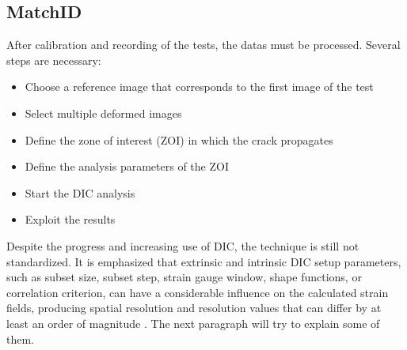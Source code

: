 \subsection{MatchID}

After calibration and recording of the tests, the datas must be processed. Several steps are necessary:

\begin{itemize}
	\item Choose a reference image that corresponds to the first image of the test 
	\item Select multiple deformed images
	\item Define the zone of interest (ZOI) in which the crack propagates
	\item Define the analysis parameters of the ZOI
	\item Start the DIC analysis
	\item Exploit the results
\end{itemize}

Despite the progress and increasing use of DIC, the technique is still not standardized. It is emphasized that extrinsic and intrinsic DIC setup parameters, such as subset size, subset step, strain gauge window, shape functions, or correlation criterion, can have a considerable influence on the calculated strain fields, producing spatial resolution and resolution values that can differ by at least an order of magnitude \cite{DICguide2018}. The next paragraph will try to explain some of them. 

